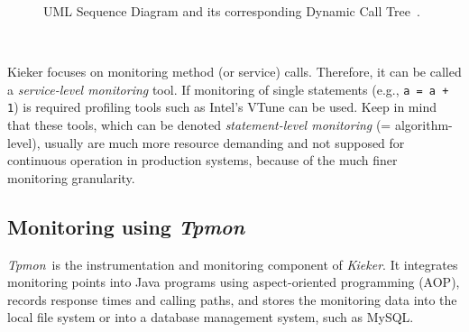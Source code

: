 \documentclass[a4paper,12pt]{scrartcl}
\newcommand{\tpmon}{\textit{Tpmon}}
\newcommand{\kieker}{\textit{Kieker}}
\begin{document}
\begin{figure}
\centering
{}
\hspace{1cm}
\caption{UML Sequence Diagram and its corresponding Dynamic Call Tree~\citep{RohrVanHoornGieseckeMatevskaHasselbring08TraceContextSensitivePerformanceModelsFromMonitoringDataOfSoftwareSystems}.
}\label{visualizationExample1}
\end{figure}

\

Kieker focuses on monitoring method (or service) calls. Therefore, it can be called a \textit{service-level monitoring} tool. If monitoring of single statements (e.g., \small \texttt{a = a + 1}\normalsize) is required profiling tools such as Intel's VTune can be used. Keep in mind that these tools, which can be denoted \textit{statement-level monitoring} (= algorithm-level), usually are much more resource demanding and not supposed for continuous operation in production systems, because of the much finer monitoring granularity.

\subsection{Monitoring using \tpmon}

\tpmon\ is the instrumentation and monitoring component of \kieker. It integrates monitoring points into Java programs using aspect-oriented programming (AOP), records response times and calling paths, and stores the monitoring data into the local file system or into a database management system, such as MySQL.
\end{document}
